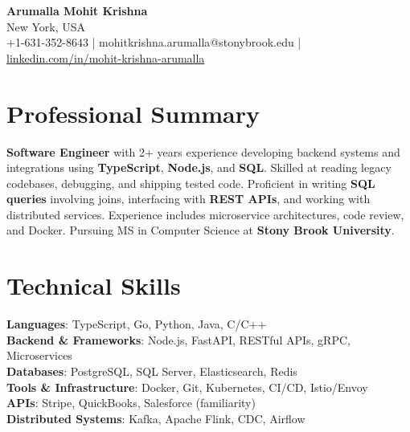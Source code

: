\documentclass[letterpaper,11pt]{article}
\begin{document}
\begin{center}
  {\Large \textbf{Arumalla Mohit Krishna}} \\
  New York, USA \\
  +1-631-352-8643 \enspace | \enspace mohitkrishna.arumalla@stonybrook.edu \enspace | \enspace \href{https://www.linkedin.com/in/mohit-krishna-arumalla}{linkedin.com/in/mohit-krishna-arumalla}
\end{center}

\section{Professional Summary}
  \begin{itemize}[leftmargin=0.15in, label={}]
    \small{\item{
     \textbf{Software Engineer} with 2+ years experience developing backend systems and integrations using \textbf{TypeScript}, \textbf{Node.js}, and \textbf{SQL}. Skilled at reading legacy codebases, debugging, and shipping tested code. Proficient in writing \textbf{SQL queries} involving joins, interfacing with \textbf{REST APIs}, and working with distributed services. Experience includes microservice architectures, code review, and Docker. Pursuing MS in Computer Science at \textbf{Stony Brook University}.
    }}
  \end{itemize}
\vspace{-16pt}

\section{Technical Skills}
 \begin{itemize}[leftmargin=0.15in, label={}]
    \small{\item{
     \textbf{Languages}: TypeScript, Go, Python, Java, C/C++ \\
     \textbf{Backend \& Frameworks}: Node.js, FastAPI, RESTful APIs, gRPC, Microservices \\
     \textbf{Databases}: PostgreSQL, SQL Server, Elasticsearch, Redis \\
     \textbf{Tools \& Infrastructure}: Docker, Git, Kubernetes, CI/CD, Istio/Envoy \\
     \textbf{APIs}: Stripe, QuickBooks, Salesforce (familiarity) \\
     \textbf{Distributed Systems}: Kafka, Apache Flink, CDC, Airflow \\
    }}
 \end{itemize}
\vspace{-16pt}
\end{document}
